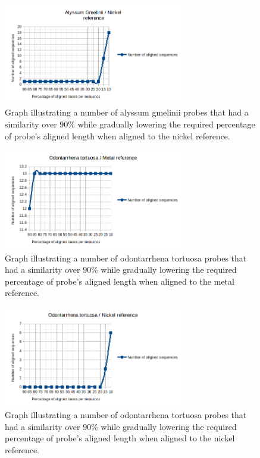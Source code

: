 \begin{figure}
\centerline{
	\includegraphics[width=0.7\textwidth]{images/gmelinii_nickel.png}
}
\caption[Lowering of the required alignment length for succesful alignment]{Graph illustrating a number of alyssum gmelinii probes that had a similarity over $90\%$ while gradually lowering the required percentage of probe's aligned length when aligned to the nickel reference.}
\label{obr:gmel_nick}
\end{figure}

\begin{figure}
\centerline{
	\includegraphics[width=0.7\textwidth]{images/odontarrhena_metal.png}
}
\caption[Lowering of the required alignment length for succesful alignment]{Graph illustrating a number of odontarrhena tortuosa probes that had a similarity over $90\%$ while gradually lowering the required percentage of probe's aligned length when aligned to the metal reference.}
\label{obr:odo_met}
\end{figure}

\begin{figure}
\centerline{
	\includegraphics[width=0.7\textwidth]{images/odontarrhena_nickel.png}
}
\caption[Lowering of the required alignment length for succesful alignment]{Graph illustrating a number of odontarrhena tortuosa probes that had a similarity over $90\%$ while gradually lowering the required percentage of probe's aligned length when aligned to the nickel reference.}
\label{obr:odo_nick}
\end{figure}

